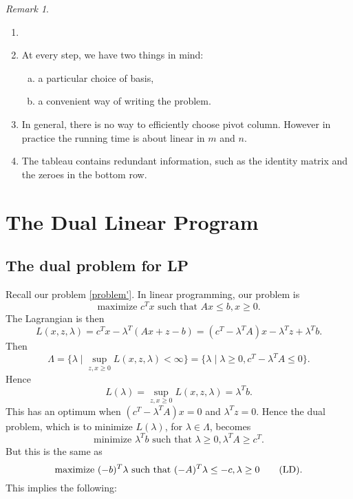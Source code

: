 \documentclass[12pt]{article}
\theoremstyle{definition}
\theoremstyle{remark}
\newtheorem*{remark}{Remark}
\begin{document}
\begin{remark}
	\begin{enumerate}[1.]
		\item[]
		\item At every step, we have two things in mind:
			\begin{enumerate}[(a)]
				\item a particular choice of basis,
				\item a convenient way of writing the problem.
			\end{enumerate}
		\item In general, there is no way to efficiently choose pivot column. However in practice the running time is about linear in $m$ and $n$.
		\item The tableau contains redundant information, such as the identity matrix and the zeroes in the bottom row.
	\end{enumerate}
	
\end{remark}

\newpage

\section{The Dual Linear Program}%
\label{sec:the_dual_linear_program}

\subsection{The dual problem for LP}%
\label{sub:the_dual_problem_for_lp}

Recall our problem \eqref{problem'}. In linear programming, our problem is
\[
	\text{maximize } c^{T}x \text{ such that } Ax \leq b, x \geq 0. \tag{LP}\label{lproblem}
\]
The Lagrangian is then
\[
	L(x, z, \lambda) = c^Tx - \lambda^{T}(Ax + z - b) = (c^{T} - \lambda^{T}A)x - \lambda^{T}z + \lambda^{T}b
.\]
Then
\[
	\Lambda = \{\lambda \mid \sup_{z, x \geq 0} L(x, z, \lambda) < \infty\} = \{ \lambda \mid \lambda \geq 0, c^{T} - \lambda^{T}A \leq 0\}
.\]
Hence
\[
	L(\lambda) = \sup_{z, x \geq 0} L(x, z, \lambda) = \lambda^{T}b
.\]
This has an optimum when $(c^{T} - \lambda^{T}A)x = 0$ and $\lambda^{T}z = 0$. Hence the dual problem, which is to minimize $L(\lambda)$, for $\lambda \in \Lambda$, becomes
\[
	\text{minimize } \lambda^{T}b \text{ such that } \lambda \geq 0, \lambda^{T}A \geq c^{T}.
\]
But this is the same as
\[
	\text{maximize } (-b)^{T}\lambda \text{ such that } (-A)^{T}\lambda \leq -c, \lambda \geq 0 \tag{LD}\label{ldual}\index{dual linear problem}
.\]
This implies the following:
\end{document}

